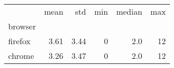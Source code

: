 \begin{tabular}{lrrrrr}
\toprule
{} &  mean &   std &  min &  median &  max \\
browser &       &       &      &         &      \\
\midrule
firefox &  3.61 &  3.44 &    0 &     2.0 &   12 \\
chrome  &  3.26 &  3.47 &    0 &     2.0 &   12 \\
\bottomrule
\end{tabular}
